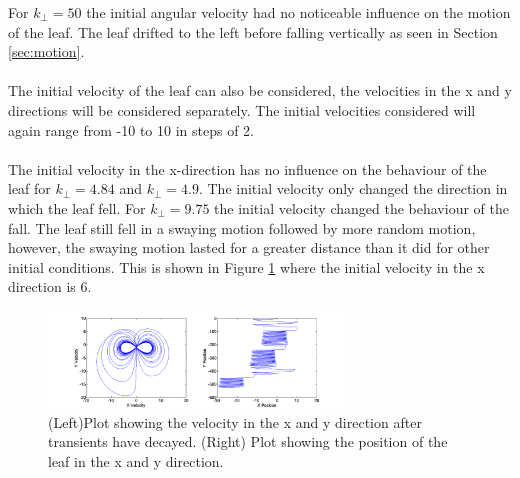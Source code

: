 For $k_{\perp}=50$ the initial angular velocity had no noticeable influence on the motion of the leaf. The leaf drifted to the left before falling vertically as seen in Section \ref{sec:motion}.
\\
\\
The initial velocity of the leaf can also be considered, the velocities in the x and y directions will be considered separately. The initial velocities considered will again range from -10 to 10 in steps of 2. 
\\
\\
The initial velocity in the x-direction has no influence on the behaviour of the leaf for $k_{\perp}=4.84$ and $k_{\perp}=4.9$. The initial velocity only changed the direction in which the leaf fell. For $k_{\perp}=9.75$ the initial velocity changed the behaviour of the fall. The leaf still fell in a swaying motion followed by more random motion, however, the swaying motion lasted for a greater distance than it did for other initial conditions.%
This is shown in Figure \ref{fig:kper9.75U0_6} where the initial velocity in the x direction is 6.

\begin{figure}[H]
\centering
\includegraphics[width=0.7\textwidth]{IU_6_kper_9_75.png}
\caption{\label{fig:kper9.75U0_6}(Left)Plot showing the velocity in the x and y direction after transients have decayed. (Right) Plot showing the position of the leaf in the x and y direction.
}
\end{figure}

